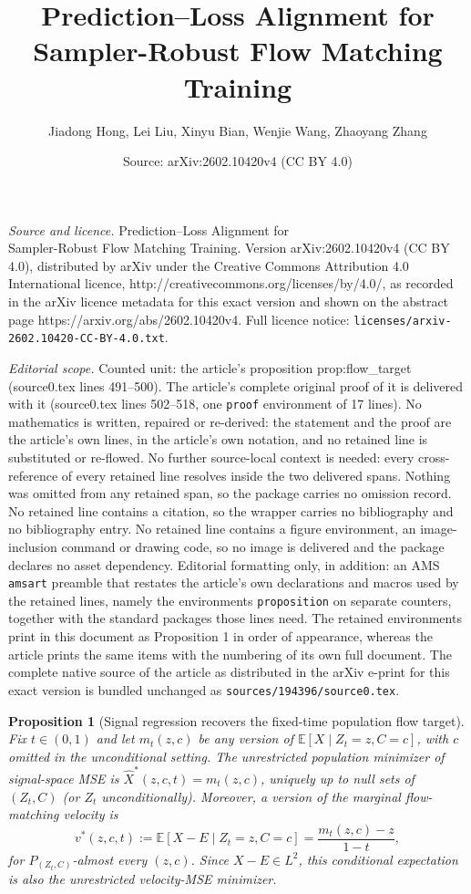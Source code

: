 \documentclass[10pt,a4paper]{amsart}
\title{Prediction--Loss Alignment for\\ Sampler-Robust Flow Matching Training}
\author{Jiadong Hong, Lei Liu, Xinyu Bian, Wenjie Wang, Zhaoyang Zhang}
\date{Source: arXiv:2602.10420v4 (CC BY 4.0)}
\newtheorem{proposition}{Proposition}
\newcommand{\Ex}{\mathbb{E}}
\begin{document}
\maketitle

\noindent\emph{Source and licence.} Prediction--Loss Alignment for\\ Sampler-Robust Flow Matching Training. Version arXiv:2602.10420v4 (CC BY 4.0), distributed by arXiv under the Creative Commons Attribution 4.0 International licence, http://creativecommons.org/licenses/by/4.0/, as recorded in the arXiv licence metadata for this exact version and shown on the abstract page https://arxiv.org/abs/2602.10420v4. Full licence notice: \texttt{licenses/arxiv-2602.10420-CC-BY-4.0.txt}.\par\smallskip

\noindent\textit{Editorial scope.} Counted unit: the article's proposition prop:flow\_target (source0.tex lines 491--500). The article's complete original proof of it is delivered with it (source0.tex lines 502--518, one \texttt{proof} environment of 17 lines). No mathematics is written, repaired or re-derived: the statement and the proof are the article's own lines, in the article's own notation, and no retained line is substituted or re-flowed.  No further source-local context is needed: every cross-reference of every retained line resolves inside the two delivered spans.  Nothing was omitted from any retained span, so the package carries no omission record.  No retained line contains a citation, so the wrapper carries no bibliography and no bibliography entry.  No retained line contains a figure environment, an image-inclusion command or drawing code, so no image is delivered and the package declares no asset dependency.  Editorial formatting only, in addition: an AMS \texttt{amsart} preamble that restates the article's own declarations and macros used by the retained lines, namely the environments \texttt{proposition} on separate counters, together with the standard packages those lines need.  The retained environments print in this document as Proposition 1 in order of appearance, whereas the article prints the same items with the numbering of its own full document.  The complete native source of the article as distributed in the arXiv e-print for this exact version is bundled unchanged as \texttt{sources/194396/source0.tex}.
\begin{proposition}[Signal regression recovers the fixed-time population flow target]
\label{prop:flow_target}
Fix $t\in(0,1)$ and let $m_t(z,c)$ be any version of $\Ex[X\mid Z_t=z,C=c]$, with $c$ omitted in the unconditional setting. The unrestricted population minimizer of signal-space MSE is $\hat X^*(z,c,t)=m_t(z,c)$, uniquely up to null sets of $(Z_t,C)$ (or $Z_t$ unconditionally). Moreover, a version of the marginal flow-matching velocity is
\begin{equation}
v^*(z,c,t):=\Ex[X-E\mid Z_t=z,C=c]
=\frac{m_t(z,c)-z}{1-t},
\label{eq:population_flow_target}
\end{equation}
for $P_{(Z_t,C)}$-almost every $(z,c)$. Since $X-E\in L^2$, this conditional expectation is also the unrestricted velocity-MSE minimizer.
\end{proposition}
\end{document}
